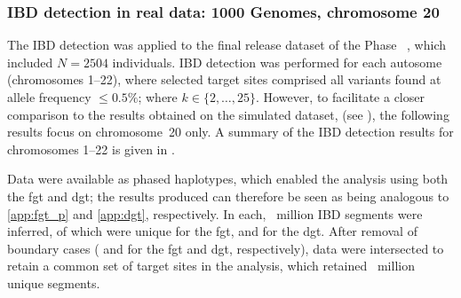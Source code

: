 %





%
\subsubsection{IBD detection in real data: 1000 Genomes, chromosome 20}\label{sec:fgt_dgt_1kg20}
%

The IBD detection  was applied to the final release dataset of the  Phase~ \citep{GenomesProjectConsortium:2012co,Auton:2015gk}, which included ${N=\num{2504}}$ individuals.
IBD detection was performed for each autosome (chromosomes \mbox{1--22}), where selected target sites comprised all variants found at allele frequency ${\leq 0.5\%}$; \ie \fk{} where ${k \in \{2, \ldots, 25\}}$.
However, to facilitate a closer comparison to the results obtained on the simulated dataset,  (see ), the following results focus on chromosome~20 only.
A summary of the IBD detection results for chromosomes \mbox{1--22} is given in .

%

%

Data were available as phased haplotypes, which enabled the analysis using both the \gls{fgt} and \gls{dgt}; \ie the results produced can therefore be seen as being analogous to \cref{app:fgt_p} and \cref{app:dgt}, respectively.
In each, ~million IBD segments were inferred, of which  were unique for the \gls{fgt}, and  for the \gls{dgt}.
After removal of boundary cases ( and  for the \gls{fgt} and \gls{dgt}, respectively), data were intersected to retain a common set of target sites in the analysis, which retained ~million unique segments.

